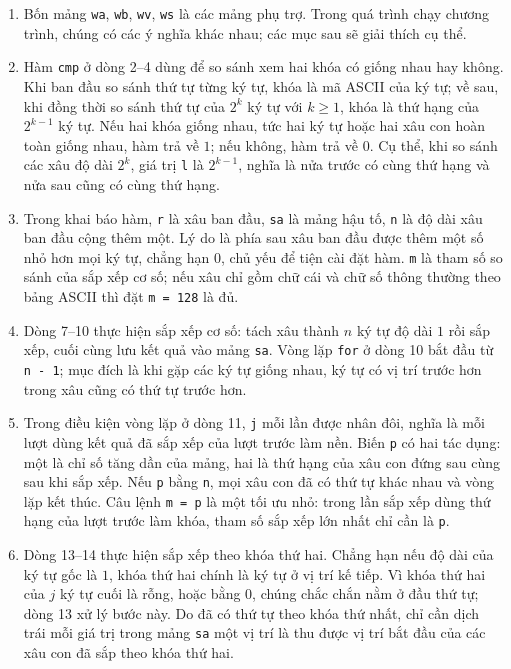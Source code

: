 \documentclass[11pt]{article}
\begin{document}
\begin{enumerate}
  \item Bốn mảng \texttt{wa}, \texttt{wb}, \texttt{wv}, \texttt{ws} là các
  mảng phụ trợ. Trong quá trình chạy chương trình, chúng có các ý nghĩa khác
  nhau; các mục sau sẽ giải thích cụ thể.

  \item Hàm \texttt{cmp} ở dòng 2--4 dùng để so sánh xem hai khóa có giống
  nhau hay không. Khi ban đầu so sánh thứ tự từng ký tự, khóa là mã ASCII của
  ký tự; về sau, khi đồng thời so sánh thứ tự của $2^k$ ký tự với $k\ge 1$,
  khóa là thứ hạng của $2^{k-1}$ ký tự. Nếu hai khóa giống nhau, tức hai ký tự
  hoặc hai xâu con hoàn toàn giống nhau, hàm trả về $1$; nếu không, hàm trả về
  $0$. Cụ thể, khi so sánh các xâu độ dài $2^k$, giá trị \texttt{l} là
  $2^{k-1}$, nghĩa là nửa trước có cùng thứ hạng và nửa sau cũng có cùng thứ
  hạng.

  \item Trong khai báo hàm, \texttt{r} là xâu ban đầu, \texttt{sa} là mảng hậu
  tố, \texttt{n} là độ dài xâu ban đầu cộng thêm một. Lý do là phía sau xâu
  ban đầu được thêm một số nhỏ hơn mọi ký tự, chẳng hạn $0$, chủ yếu để tiện
  cài đặt hàm. \texttt{m} là tham số so sánh của sắp xếp cơ số; nếu xâu chỉ
  gồm chữ cái và chữ số thông thường theo bảng ASCII thì đặt \texttt{m = 128}
  là đủ.

  \item Dòng 7--10 thực hiện sắp xếp cơ số: tách xâu thành $n$ ký tự độ dài
  $1$ rồi sắp xếp, cuối cùng lưu kết quả vào mảng \texttt{sa}. Vòng lặp
  \texttt{for} ở dòng 10 bắt đầu từ \texttt{n - 1}; mục đích là khi gặp các ký
  tự giống nhau, ký tự có vị trí trước hơn trong xâu cũng có thứ tự trước hơn.

  \item Trong điều kiện vòng lặp ở dòng 11, \texttt{j} mỗi lần được nhân đôi,
  nghĩa là mỗi lượt dùng kết quả đã sắp xếp của lượt trước làm nền. Biến
  \texttt{p} có hai tác dụng: một là chỉ số tăng dần của mảng, hai là thứ hạng
  của xâu con đứng sau cùng sau khi sắp xếp. Nếu \texttt{p} bằng \texttt{n},
  mọi xâu con đã có thứ tự khác nhau và vòng lặp kết thúc. Câu lệnh
  \texttt{m = p} là một tối ưu nhỏ: trong lần sắp xếp dùng thứ hạng của lượt
  trước làm khóa, tham số sắp xếp lớn nhất chỉ cần là \texttt{p}.

  \item Dòng 13--14 thực hiện sắp xếp theo khóa thứ hai. Chẳng hạn nếu độ dài
  của ký tự gốc là $1$, khóa thứ hai chính là ký tự ở vị trí kế tiếp. Vì khóa
  thứ hai của $j$ ký tự cuối là rỗng, hoặc bằng $0$, chúng chắc chắn nằm ở đầu
  thứ tự; dòng 13 xử lý bước này. Do đã có thứ tự theo khóa thứ nhất, chỉ cần
  dịch trái mỗi giá trị trong mảng \texttt{sa} một vị trí là thu được vị trí
  bắt đầu của các xâu con đã sắp theo khóa thứ hai.


\end{enumerate}
\end{document}
